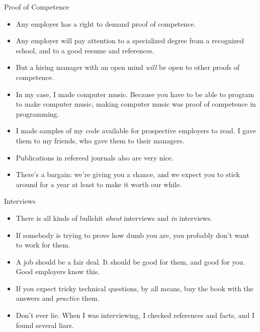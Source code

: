 \documentclass{beamer}
\begin{document}
\begin{frame}{Proof of Competence}
  \begin{itemize}
  \item
    Any employer has a right to demand proof of competence.
  \item
    Any employer will pay attention to a specialized degree from a recognized school, and to a good resume and references.
  \item
    But a hiring manager with an open mind \emph{will} be open to other proofs of competence.
  \item
    In my case, I made computer music. Because you have to be able to program to make computer music, making computer music was proof of competence in programming.
  \item
    I made samples of my code available for prospective employers to read. I gave them to my friends, who gave them to their managers.
  \item
    Publications in refereed journals also are very nice.
  \item
    There's a bargain: we're giving you a chance, and we expect you to stick around for a year at least to make it worth our while.
  \end{itemize}
\end{frame}

\begin{frame}{Interviews}
  \begin{itemize}
  \item
    There is all kinds of bullshit \emph{about} interviews and \emph{in} interviews.
  \item
    If somebody is trying to prove how dumb you are, you probably don't want to work for them.
  \item
    A job should be a fair deal. It should be good for them, and good for you. Good employers know this.
  \item
    If you expect tricky technical questions, by all means, buy the book with the answers and \emph{practice} them.
  \item
  	 Don't ever lie. When I was interviewing, I checked references and facts, and I found several liars.
  \end{itemize}
\end{frame}
\end{document}

